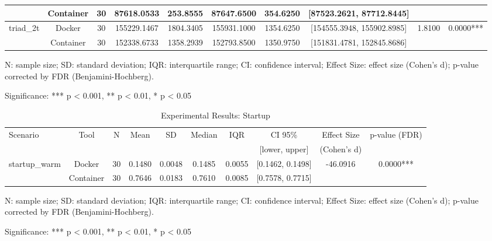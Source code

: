 \documentclass{article}
\begin{document}
\begin{table}[h]
\begin{tabular}{lccccccccc}
 & Container & 30 & 87618.0533 & 253.8555 & 87647.6500 & 354.6250 & [87523.2621, 87712.8445] &  &  \\
\midrule
\multirow{2}{*}{triad\_2t} & Docker & 30 & 155229.1467 & 1804.3405 & 155931.1000 & 1354.6250 & [154555.3948, 155902.8985] & 1.8100 & 0.0000*** \\
 & Container & 30 & 152338.6733 & 1358.2939 & 152793.8500 & 1350.9750 & [151831.4781, 152845.8686] &  &  \\
\midrule
\bottomrule
\end{tabular}
\begin{tablenotes}
\small
\item N: sample size; SD: standard deviation; IQR: interquartile range; CI: confidence interval; Effect Size: effect size (Cohen's d); p-value corrected by FDR (Benjamini-Hochberg).
\item Significance: *** p < 0.001, ** p < 0.01, * p < 0.05
\end{tablenotes}
\end{table}


\begin{table}[h]
\centering
\small
\caption{Experimental Results: Startup}
\label{tab:startup}
\begin{tabular}{lccccccccc}
\toprule
Scenario & Tool & N & Mean & SD & Median & IQR & CI 95\% & Effect Size & p-value (FDR) \\
 & & & & & & & [lower, upper] & (Cohen's d) & \\
\midrule
\multirow{2}{*}{startup\_warm} & Docker & 30 & 0.1480 & 0.0048 & 0.1485 & 0.0055 & [0.1462, 0.1498] & -46.0916 & 0.0000*** \\
 & Container & 30 & 0.7646 & 0.0183 & 0.7610 & 0.0085 & [0.7578, 0.7715] &  &  \\
\midrule
\bottomrule
\end{tabular}
\begin{tablenotes}
\small
\item N: sample size; SD: standard deviation; IQR: interquartile range; CI: confidence interval; Effect Size: effect size (Cohen's d); p-value corrected by FDR (Benjamini-Hochberg).
\item Significance: *** p < 0.001, ** p < 0.01, * p < 0.05
\end{tablenotes}
\end{table}
\end{document}
